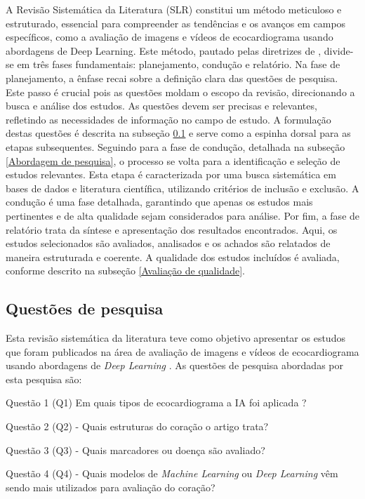 A Revisão Sistemática da Literatura (SLR) constitui um método meticuloso e estruturado, essencial para compreender as tendências e os avanços em campos específicos, como a avaliação de imagens e vídeos de ecocardiograma usando abordagens de Deep Learning. Este método, pautado pelas diretrizes de \textcite{kitchenham2009systematic}, divide-se em três fases fundamentais: planejamento, condução e relatório. Na fase de planejamento, a ênfase recai sobre a definição clara das questões de pesquisa. Este passo é crucial pois as questões moldam o escopo da revisão, direcionando a busca e análise dos estudos. As questões devem ser precisas e relevantes, refletindo as necessidades de informação no campo de estudo. A formulação destas questões é descrita na subseção \ref{Questões de pesquisa} e serve como a espinha dorsal para as etapas subsequentes. Seguindo para a fase de condução, detalhada na subseção \ref{Abordagem de pesquisa}, o processo se volta para a identificação e seleção de estudos relevantes. Esta etapa é caracterizada por uma busca sistemática em bases de dados e literatura científica, utilizando critérios de inclusão e exclusão. A condução é uma fase detalhada, garantindo que apenas os estudos mais pertinentes e de alta qualidade sejam considerados para análise. Por fim, a fase de relatório trata da síntese e apresentação dos resultados encontrados. Aqui, os estudos selecionados são avaliados, analisados e os achados são relatados de maneira estruturada e coerente. A qualidade dos estudos incluídos é avaliada, conforme descrito na subseção \ref{Avaliação de qualidade}.

\subsection{Questões de pesquisa}
\label{Questões de pesquisa}

Esta revisão sistemática da literatura teve como objetivo apresentar os estudos que foram publicados na área de avaliação de imagens e vídeos de ecocardiograma  usando abordagens de \textit{Deep Learning} . As questões de pesquisa abordadas por esta pesquisa são:

Questão 1 (Q1) Em quais tipos de ecocardiograma a IA foi aplicada ?

Questão 2 (Q2) - Quais estruturas do coração o artigo trata?

Questão 3 (Q3) - Quais marcadores ou doença são avaliado?

Questão 4 (Q4) - Quais modelos de \textit{Machine Learning}  ou \textit{Deep Learning}  vêm sendo mais utilizados para avaliação do coração?

